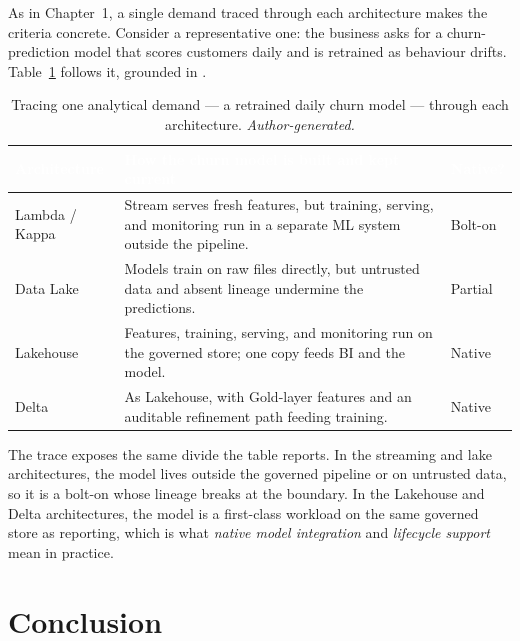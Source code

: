 As in Chapter~1, a single demand traced through each architecture makes the criteria concrete. Consider a representative one: the business asks for a churn-prediction model that scores customers daily and is retrained as behaviour drifts. Table~\ref{tab:ch2-tracing} follows it, grounded in \parencite{marz2015, kreps2014, nambiar2022, armbrust2021, databricks2022}.

\begin{table}[H]
\centering
\renewcommand{\arraystretch}{1.35}
\caption{Tracing one analytical demand --- a retrained daily churn model --- through each architecture. \textit{Author-generated.}}
\label{tab:ch2-tracing}
\begin{tabularx}{\linewidth}{|>{\raggedright\arraybackslash}p{2.6cm}|>{\raggedright\arraybackslash}X|>{\raggedright\arraybackslash}p{2.3cm}|}
\hline
\rowcolor{tblheader}
\textcolor{white}{\textbf{Architecture}} &
\textcolor{white}{\textbf{How the churn model is built and kept current}} &
\textcolor{white}{\textbf{Native?}} \\
\hline
Lambda / Kappa & Stream serves fresh features, but training, serving, and monitoring run in a separate ML system outside the pipeline. & Bolt-on \\
Data Lake & Models train on raw files directly, but untrusted data and absent lineage undermine the predictions. & Partial \\
Lakehouse & Features, training, serving, and monitoring run on the governed store; one copy feeds BI and the model. & Native \\
Delta & As Lakehouse, with Gold-layer features and an auditable refinement path feeding training. & Native \\
\hline
\end{tabularx}
\end{table}

The trace exposes the same divide the table reports. In the streaming and lake architectures, the model lives outside the governed pipeline or on untrusted data, so it is a bolt-on whose lineage breaks at the boundary. In the Lakehouse and Delta architectures, the model is a first-class workload on the same governed store as reporting, which is what \textit{native model integration} and \textit{lifecycle support} mean in practice.

\section*{Conclusion}

